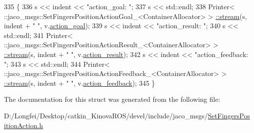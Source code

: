 \begin{DoxyCode}
335   \{
336     s << indent << \textcolor{stringliteral}{"action\_goal: "};
337     s << std::endl;
338     Printer< ::jaco\_msgs::SetFingersPositionActionGoal\_<ContainerAllocator> >
      \hyperlink{structros_1_1message__operations_1_1Printer_3_01_1_1jaco__msgs_1_1SetFingersPositionAction___3_01ContainerAllocator_01_4_01_4_af3d00065aec849c10d9d4dcaeb49b8f1}{::stream}(s, indent + \textcolor{stringliteral}{"  "}, v.\hyperlink{structjaco__msgs_1_1SetFingersPositionAction___a35a5e82537b8fceaae4c0eef45b1e572}{action\_goal});
339     s << indent << \textcolor{stringliteral}{"action\_result: "};
340     s << std::endl;
341     Printer< ::jaco\_msgs::SetFingersPositionActionResult\_<ContainerAllocator> >
      \hyperlink{structros_1_1message__operations_1_1Printer_3_01_1_1jaco__msgs_1_1SetFingersPositionAction___3_01ContainerAllocator_01_4_01_4_af3d00065aec849c10d9d4dcaeb49b8f1}{::stream}(s, indent + \textcolor{stringliteral}{"  "}, v.\hyperlink{structjaco__msgs_1_1SetFingersPositionAction___addb918b75ecf45c25c778e6621200058}{action\_result});
342     s << indent << \textcolor{stringliteral}{"action\_feedback: "};
343     s << std::endl;
344     Printer< ::jaco\_msgs::SetFingersPositionActionFeedback\_<ContainerAllocator> >
      \hyperlink{structros_1_1message__operations_1_1Printer_3_01_1_1jaco__msgs_1_1SetFingersPositionAction___3_01ContainerAllocator_01_4_01_4_af3d00065aec849c10d9d4dcaeb49b8f1}{::stream}(s, indent + \textcolor{stringliteral}{"  "}, v.\hyperlink{structjaco__msgs_1_1SetFingersPositionAction___a63d4e32eae92c1eb8284813b5c6e8323}{action\_feedback});
345   \}
\end{DoxyCode}


The documentation for this struct was generated from the following file\+:\begin{DoxyCompactItemize}
\item 
D\+:/\+Longfei/\+Desktop/catkin\+\_\+\+Kinova\+R\+O\+S/devel/include/jaco\+\_\+msgs/\hyperlink{SetFingersPositionAction_8h}{Set\+Fingers\+Position\+Action.\+h}\end{DoxyCompactItemize}
